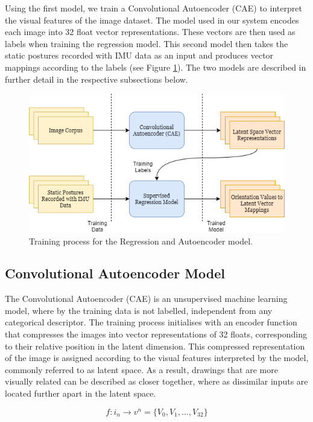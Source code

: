 Using the first model, we train a Convolutional Autoencoder (CAE) to interpret the visual features of the image dataset. The model used in our system encodes each image into 32 float vector representations. These vectors are then used as labels when training the regression model. This second model then takes the static postures recorded with IMU  data as an input and produces vector mappings according to the labels (see Figure \ref{fig:training_fig}). The two models are described in further detail in the respective subsections below.

\begin{figure}[ht]
    \centering
    \includegraphics[width=\textwidth]{Chapters/Figures/modi_dis/training_process.png}
    \caption{Training process for the Regression and Autoencoder model.}
    \label{fig:training_fig}
\end{figure}

\subsection{Convolutional Autoencoder Model}

The Convolutional Autoencoder (CAE) is an unsupervised machine learning model, where by the training data is not labelled, independent from any categorical descriptor. The training process initialises with an encoder function that compresses the images into vector representations of 32 floats, corresponding to their relative position in the latent dimension. This compressed representation of the image is assigned according to the visual features interpreted by the model, commonly referred to as latent space. As a result, drawings that are more visually related can be described as closer together, where as dissimilar inputs are located further apart in the latent space.

\[ f:i_n\xrightarrow{}v^n = \{V_0, V_1,... ,V_{32}\} \]

